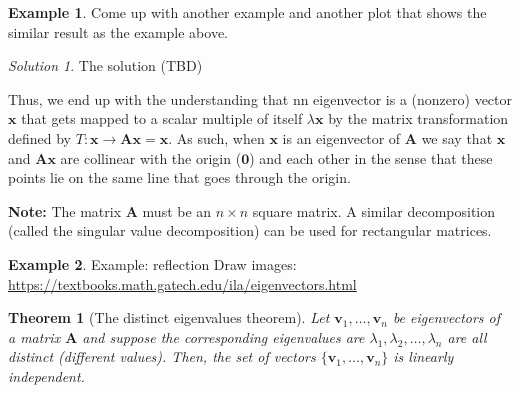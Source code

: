 \documentclass[
]{book}
\newtheorem{theorem}{Theorem}[chapter]
\theoremstyle{definition}
\theoremstyle{definition}
\newtheorem{example}{Example}[chapter]
\theoremstyle{definition}
\theoremstyle{definition}
\theoremstyle{remark}
\newtheorem*{solution}{Solution}
\begin{document}
\begin{example}
Come up with another example and another plot that shows the similar result as the example above.
\end{example}

\begin{solution}
The solution (TBD)
\end{solution}

Thus, we end up with the understanding that nn eigenvector is a (nonzero) vector \(\mathbf{x}\) that gets mapped to a scalar multiple of itself \(\lambda \mathbf{x}\) by the matrix transformation defined by \(T: \mathbf{x} \rightarrow \mathbf{A}\mathbf{x} = \mathbf{x}\). As such, when \(\mathbf{x}\) is an eigenvector of \(\mathbf{A}\) we say that \(\mathbf{x}\) and \(\mathbf{A} \mathbf{x}\) are collinear with the origin (\(\mathbf{0}\)) and each other in the sense that these points lie on the same line that goes through the origin.

\textbf{Note:} The matrix \(\mathbf{A}\) must be an \(n \times n\) square matrix. A similar decomposition (called the singular value decomposition) can be used for rectangular matrices.

\begin{example}
Example: reflection
Draw images: \url{https://textbooks.math.gatech.edu/ila/eigenvectors.html}
\end{example}

\begin{theorem}[The distinct eigenvalues theorem]
\protect\hypertarget{thm:distinct-eigenvalues}{}\label{thm:distinct-eigenvalues}Let \(\mathbf{v}_1, \ldots, \mathbf{v}_n\) be eigenvectors of a matrix \(\mathbf{A}\) and suppose the corresponding eigenvalues are \(\lambda_1, \lambda_2, \ldots, \lambda_n\) are all distinct (different values). Then, the set of vectors \(\{\mathbf{v}_1, \ldots, \mathbf{v}_n\}\) is linearly independent.
\end{theorem}
\end{document}
